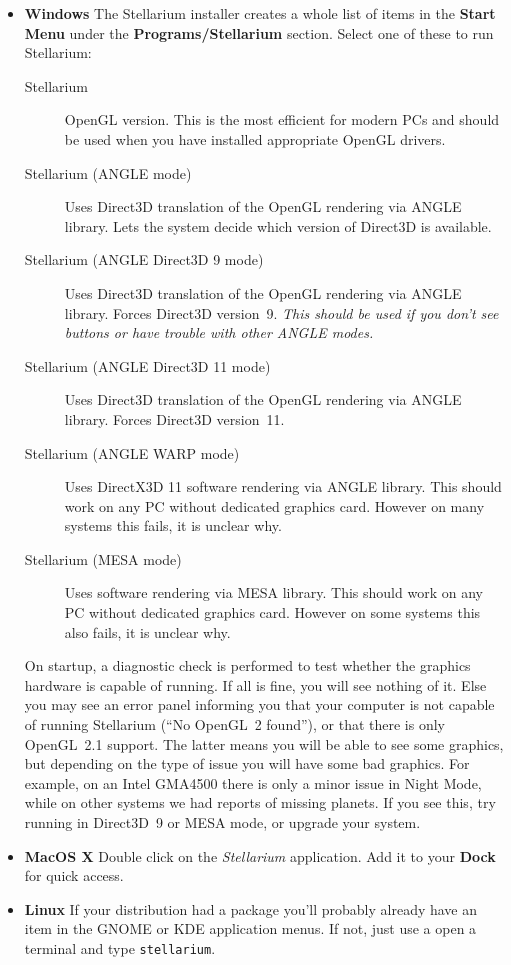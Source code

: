 \begin{itemize}
\item
  \textbf{Windows} The Stellarium installer creates a whole list of items in the
  \textbf{Start Menu} under the \textbf{Programs/Stellarium} section. Select one of these to
  run Stellarium:
  \begin{description}
  \item[Stellarium] OpenGL version. This is the most efficient for
    modern PCs and should be used when you have installed appropriate
    OpenGL drivers.
  \item[Stellarium (ANGLE mode)] Uses Direct3D translation of the
    OpenGL rendering via ANGLE library. Lets the system decide which
    version of Direct3D is available.
  \item[Stellarium (ANGLE Direct3D 9 mode)] Uses Direct3D translation
    of the OpenGL rendering via ANGLE library. Forces Direct3D
    version~9. \emph{This should be used if you don't see buttons or have
    trouble with other ANGLE modes.}
  \item[Stellarium (ANGLE Direct3D 11 mode)] Uses Direct3D translation
    of the OpenGL rendering via ANGLE library. Forces Direct3D
    version~11.
  \item[Stellarium (ANGLE WARP mode)] Uses DirectX3D 11 software rendering via ANGLE
    library. This should work on any PC without dedicated graphics
    card. However on many systems this fails, it is unclear why.
  \item[Stellarium (MESA mode)] Uses software rendering via MESA
    library. This should work on any PC without dedicated graphics
    card. However on some systems this also fails, it is unclear why.
  \end{description}
  On startup, a diagnostic check is performed to test whether the
  graphics hardware is capable of running. If all is fine, you will
  see nothing of it.  Else you may see an error panel informing you
  that your computer is not capable of running Stellarium (``No
  OpenGL~2 found''), or that there is only OpenGL~2.1 support. The
  latter means you will be able to see some graphics, but depending on
  the type of issue you will have some bad graphics. For example, on
  an Intel GMA4500 there is only a minor issue in Night Mode, while on
  other systems we had reports of missing planets. If you see this,
  try running in Direct3D~9 or MESA mode, or upgrade your system.
\item
  \textbf{MacOS X} Double click on the \emph{Stellarium} application.
  Add it to your \textbf{Dock} for quick access.
\item
  \textbf{Linux} If your distribution had a package you'll probably
  already have an item in the GNOME or KDE application menus. If not,
  just use a open a terminal and type \texttt{stellarium}.
\end{itemize}


